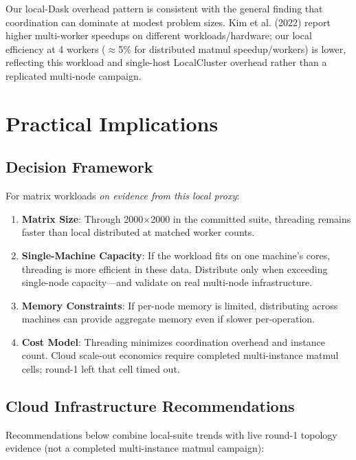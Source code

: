 Our local-Dask overhead pattern is consistent with the general finding that coordination can dominate at modest problem sizes. Kim et al. (2022) report higher multi-worker speedups on different workloads/hardware; our local efficiency at 4 workers ($\approx$5\% for distributed matmul speedup/workers) is lower, reflecting this workload and single-host LocalCluster overhead rather than a replicated multi-node campaign.

\section{Practical Implications}

\subsection{Decision Framework}

For matrix workloads \textit{on evidence from this local proxy}:

\begin{enumerate}
    \item \textbf{Matrix Size}: Through 2000×2000 in the committed suite, threading remains faster than local distributed at matched worker counts.
    
    \item \textbf{Single-Machine Capacity}: If the workload fits on one machine's cores, threading is more efficient in these data. Distribute only when exceeding single-node capacity—and validate on real multi-node infrastructure.
    
    \item \textbf{Memory Constraints}: If per-node memory is limited, distributing across machines can provide aggregate memory even if slower per-operation.
    
    \item \textbf{Cost Model}: Threading minimizes coordination overhead and instance count. Cloud scale-out economics require completed multi-instance matmul cells; round-1 left that cell timed out.
\end{enumerate}

\subsection{Cloud Infrastructure Recommendations}

Recommendations below combine local-suite trends with live round-1 topology evidence (not a completed multi-instance matmul campaign):

